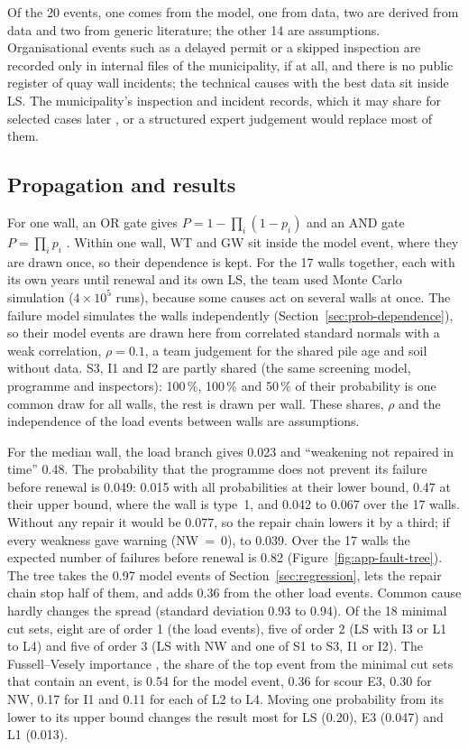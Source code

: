 Of the 20 events, one comes from the model, one from data, two are derived from
data and two from generic literature; the other 14 are assumptions.
Organisational events such as a delayed permit or a skipped inspection are
recorded only in internal files of the municipality, if at all, and there is no
public register of quay wall incidents; the technical causes with the best
data sit inside LS. The municipality's inspection and incident records,
which it may share for selected cases later \parencite{utrecht_qa2026}, or a structured expert judgement would replace
most of them.

\subsection{Propagation and results}\label{sec:ft-results}

For one wall, an OR gate gives $P = 1-\prod_i(1-p_i)$ and an AND gate
$P=\prod_i p_i$ \parencite{vesely1981ftHandbook}. Within one wall, WT and GW sit
inside the model event, where they are drawn once, so their dependence is kept.
For the 17 walls together, each with its own years until renewal and its own LS,
the team used Monte Carlo simulation ($4\times10^5$ runs), because some causes
act on several walls at once. The failure model simulates the walls
independently (Section~\ref{sec:prob-dependence}), so their model events are
drawn here from correlated standard normals with a weak correlation, $\rho=0.1$, a team
judgement for the shared pile age and soil without data.
S3, I1 and I2 are partly shared (the same screening model, programme and
inspectors): 100\,\%, 100\,\% and 50\,\% of their probability is one common draw
for all walls, the rest is drawn per wall. These shares, $\rho$ and the
independence of the load events between walls are assumptions.

For the median wall, the load branch gives 0.023 and ``weakening not repaired in
time'' 0.48. The probability that the programme does not prevent its failure
before renewal is 0.049: 0.015 with all probabilities at their lower bound, 0.47
at their upper bound, where the wall is type~1, and 0.042 to 0.067 over the 17
walls. Without any repair it would be 0.077, so the repair chain lowers it by a
third; if every weakness gave warning (NW~=~0), to 0.039. Over the 17 walls the
expected number of failures before renewal is 0.82
(Figure~\ref{fig:app-fault-tree}). The tree takes the 0.97 model events of
Section~\ref{sec:regression}, lets the repair chain stop half of them, and adds
0.36 from the other load events. Common cause hardly changes the spread
(standard deviation 0.93 to 0.94). Of the 18 minimal cut sets, eight are of order 1
(the load events), five of order 2 (LS with I3 or L1 to L4) and five of order 3
(LS with NW and one of S1 to S3, I1 or I2). The Fussell--Vesely importance
\parencite{fussell1975}, the share of the top event from the minimal cut sets
that contain an event, is 0.54 for the model event, 0.36 for scour E3, 0.30
for NW, 0.17 for I1 and 0.11 for each of L2 to L4. Moving one probability from
its lower to its upper bound changes the result most for LS (0.20), E3 (0.047)
and L1 (0.013).


